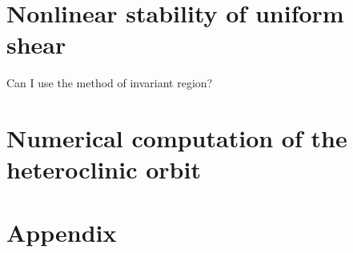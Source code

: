 \documentclass[a4paper,11pt]{article}
\def\blue{\color{blue}}
\newtheorem{theorem}{Theorem}
\theoremstyle{remark}
\begin{document}
% 

\section{Nonlinear stability of uniform shear}
{\blue Can I use the method of invariant region?}
% 
% 

\section{Numerical computation of the heteroclinic orbit}
 
\appendix
\section*{Appendix}
\renewcommand\thetheorem{\Alph{theorem}}
\setcounter{theorem}{\thetmp}
\end{document}
